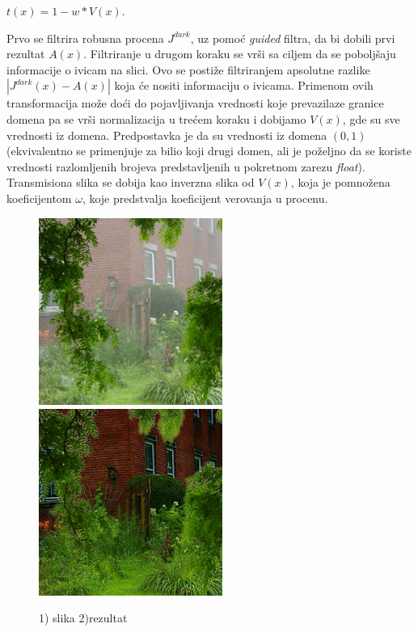 \documentclass[a4paper,12pt,titlepage]{article}
\begin{document}
\begin{center}
$t(x) = 1 - w * V(x)$.
\end{center}

Prvo se filtrira robusna procena $J^{dark}$, uz pomoć \emph{guided} filtra, da bi dobili prvi rezultat $A(x)$. Filtriranje u drugom koraku se vrši sa ciljem da se poboljšaju informacije o ivicam na slici. Ovo se postiže filtriranjem apsolutne razlike $|J^{dark}(x) - A(x)|$ koja će nositi informaciju o ivicama. Primenom ovih transformacija može doći do pojavljivanja vrednosti koje prevazilaze granice domena pa se vrši normalizacija u trećem koraku i dobijamo $V(x)$, gde su sve vrednosti iz domena. Predpostavka je da su vrednosti iz domena $(0, 1)$ (ekvivalentno se primenjuje za bilio koji drugi domen, ali je poželjno da se koriste vrednosti razlomljenih brojeva predstavljenih u pokretnom zarezu \emph{float}). Transmisiona slika se dobija kao inverzna slika od $V(x)$, koja je pomnožena koeficijentom $\omega$, koje predstvalja koeficijent verovanja u procenu.

\begin{figure}[ht!]
\centering
\includegraphics[width=60mm]{img/haze.png}
\includegraphics[width=60mm]{img/hazeRes.png}
\caption{1) slika 2)rezultat}
\label{overflow}
\end{figure}   
\end{document}

